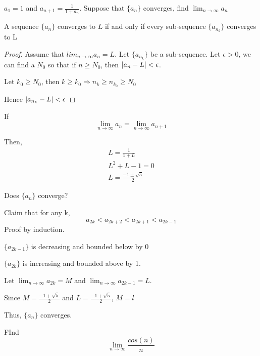 \begin{exmp}
$a_1 = 1$ and $\displaystyle a_{n+1} = \frac{1}{1+a_n}$. Suppose that $\{a_n\}$ converges, find $\lim_{n\to \infty} a_n$
\end{exmp}

\begin{prop}
A sequence $\{a_n\}$ converges to $L$ if and only if every sub-sequence $\{a_{n_k}\}$ converges to L
\end{prop}
\begin{proof}
Assume that $lim_{n\to \infty} a_n = L$. Let $\{a_{n_k}\}$ be a sub-sequence. Let $\epsilon > 0$, we can find a $N_0$ so that if $n\geq N_0$, then $\left| a_n - L \right|<\epsilon$.

Let $k_0 \geq N_0$, then $k\geq k_0 \Rightarrow n_k \geq n_{k_0}\geq N_0$

Hence $\left| a_{n_k} - L \right|<\epsilon$
\end{proof}

\begin{solution}
If \[\lim_{n\to\infty} a_n = \lim_{n\to \infty} a_{n+1}\]

Then,
\begin{gather*}
    L = \frac{1}{1+L} \\
    L^2+L-1 = 0\\
    L = \frac{-1 \pm \sqrt{5}}{2}
\end{gather*}
\end{solution}

\begin{ques}
Does $\{a_n\}$ converge?
\end{ques}
\begin{solution}
Claim that for any k,
\[a_{2k}<a_{2k+2}<a_{2k+1}<a_{2k-1}\]
Proof by induction.

$\{a_{2k-1}\}$ is decreasing and bounded below by 0

$\{a_{2k}\}$ is increasing and bounded above by 1.

Let $\lim_{n\to\infty} a_{2k} = M$ and $\lim_{n\to\infty} a_{2k-1} = L$.

Since $M = \displaystyle \frac{-1 + \sqrt{5}}{2}$ and $L = \displaystyle \frac{-1 + \sqrt{5}}{2}$, $M = l$

Thus, $\{a_n\}$ converges.
\end{solution}
\begin{exmp}
FInd $$\lim_{n\to\infty} \frac{cos(n)}{n}$$
\end{exmp}



